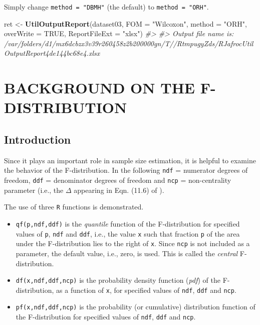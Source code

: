\documentclass[
]{book}
\newenvironment{Shaded}{\begin{snugshade}}{\end{snugshade}}
\newcommand{\CommentTok}[1]{\textcolor[rgb]{0.56,0.35,0.01}{\textit{#1}}}
\newcommand{\DataTypeTok}[1]{\textcolor[rgb]{0.13,0.29,0.53}{#1}}
\newcommand{\KeywordTok}[1]{\textcolor[rgb]{0.13,0.29,0.53}{\textbf{#1}}}
\newcommand{\NormalTok}[1]{#1}
\newcommand{\OtherTok}[1]{\textcolor[rgb]{0.56,0.35,0.01}{#1}}
\newcommand{\StringTok}[1]{\textcolor[rgb]{0.31,0.60,0.02}{#1}}
\begin{document}
Simply change \texttt{method\ =\ "DBMH"} (the default) to \texttt{method\ =\ "ORH"}.

\begin{Shaded}
\begin{Highlighting}[]
\NormalTok{ret \textless{}{-}}\StringTok{ }\KeywordTok{UtilOutputReport}\NormalTok{(dataset03, }\DataTypeTok{FOM =} \StringTok{"Wilcoxon"}\NormalTok{, }\DataTypeTok{method =} \StringTok{"ORH"}\NormalTok{, }\DataTypeTok{overWrite =} \OtherTok{TRUE}\NormalTok{, }\DataTypeTok{ReportFileExt =} \StringTok{"xlsx"}\NormalTok{)}
\CommentTok{\#\textgreater{} }
\CommentTok{\#\textgreater{} Output file name is:      /var/folders/d1/mx6dcbzx3v39r260458z2b200000gn/T//RtmpugyZds/RJafrocUtilOutputReport4de144bc68e4.xlsx}
\end{Highlighting}
\end{Shaded}

\hypertarget{SSFDistr}{%
\chapter{BACKGROUND ON THE F-DISTRIBUTION}\label{SSFDistr}}

\hypertarget{introduction-6}{%
\section{Introduction}\label{introduction-6}}

Since it plays an important role in sample size estimation, it is helpful to examine the behavior of the F-distribution. In the following \texttt{ndf} = numerator degrees of freedom, \texttt{ddf} = denominator degrees of freedom and \texttt{ncp} = non-centrality parameter (i.e., the \(\Delta\) appearing in Eqn. (11.6) of \citep{RN2680}).

The use of three \texttt{R} functions is demonstrated.

\begin{itemize}
\item
  \texttt{qf(p,ndf,ddf)} is the \emph{quantile} function of the F-distribution for specified values of \texttt{p}, \texttt{ndf} and \texttt{ddf}, i.e., the value \texttt{x} such that fraction \texttt{p} of the area under the F-distribution lies to the right of \texttt{x}. Since \texttt{ncp} is not included as a parameter, the default value, i.e., zero, is used. This is called the \emph{central} F-distribution.
\item
  \texttt{df(x,ndf,ddf,ncp)} is the probability density function (\emph{pdf}) of the F-distribution, as a function of \texttt{x}, for specified values of \texttt{ndf}, \texttt{ddf} and \texttt{ncp}.
\item
  \texttt{pf(x,ndf,ddf,ncp)} is the probability (or cumulative) distribution function of the F-distribution for specified values of \texttt{ndf}, \texttt{ddf} and \texttt{ncp}.
\end{itemize}
\end{document}
